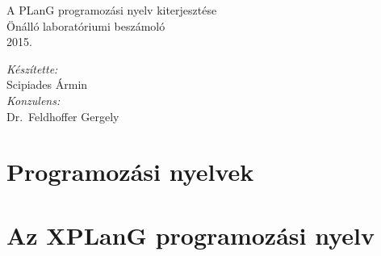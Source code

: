 \documentclass[11pt,a4paper]{article}
\theoremstyle{plain}
\begin{document}
\begin{titlepage}
\newlength\drop
\setlength\drop{0.08\textheight}

\centering
\vspace*{2\drop}

{\huge A PLanG programozási nyelv kiterjesztése}\\[\baselineskip]
{Önálló laboratóriumi beszámoló}\\[\baselineskip]

\vspace*{0.5\drop}
\large 2015.

\vfill
\begin{flushright} \large
\emph{Készítette:}\\
Scipiades Ármin\\[\baselineskip]
\emph{Konzulens:} \\
Dr.~Feldhoffer Gergely
\end{flushright}
\vspace*{\drop}

\end{titlepage}



\thispagestyle{empty}
\tableofcontents

\newpage
\setcounter{page}{1}
\section{Programozási nyelvek}
\label{sec:proglang}


\newpage
\section{Az XPLanG programozási nyelv}
\label{sec:xplang}



\newpage
\printbibliography
\end{document}

